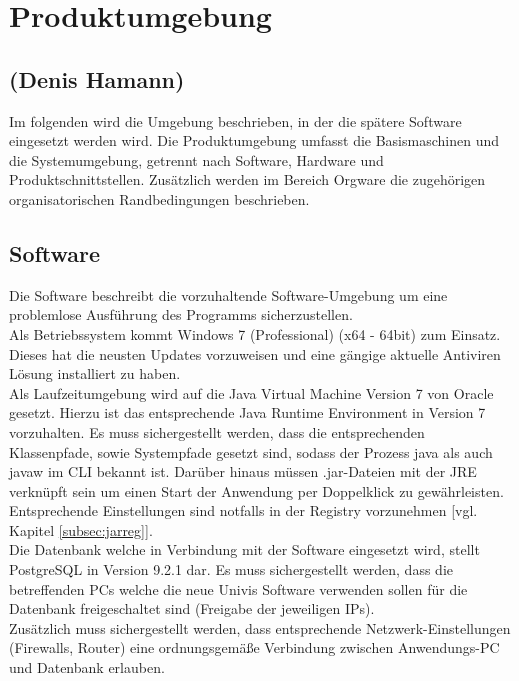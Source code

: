 \section{Produktumgebung}
\label{sec:Produktumgebung}

\subsection*{(Denis Hamann)}

Im folgenden wird die Umgebung beschrieben, in der die spätere Software eingesetzt werden wird.
Die Produktumgebung umfasst die Basismaschinen und die Systemumgebung, getrennt nach Software, Hardware und
Produktschnittstellen. Zusätzlich werden im Bereich Orgware die zugehörigen organisatorischen Randbedingungen beschrieben.

\subsection{Software}
\label{subsec:software}

Die Software beschreibt die vorzuhaltende Software-Umgebung um eine problemlose Ausführung des Programms sicherzustellen.\\


Als Betriebssystem kommt Windows 7 (Professional) (x64 - 64bit) zum Einsatz. Dieses hat die neusten Updates vorzuweisen und eine gängige aktuelle Antiviren Lösung installiert zu haben.\\

Als Laufzeitumgebung wird auf die Java Virtual Machine Version 7 von Oracle gesetzt.
Hierzu ist das entsprechende Java Runtime Environment in Version 7 vorzuhalten. Es muss sichergestellt werden, dass die entsprechenden Klassenpfade, sowie Systempfade gesetzt sind, sodass der Prozess java als auch javaw im CLI bekannt ist. Darüber hinaus müssen .jar-Dateien mit der JRE verknüpft sein um einen Start der Anwendung per Doppelklick zu gewährleisten. Entsprechende Einstellungen sind notfalls in der Registry vorzunehmen [vgl. Kapitel \ref{subsec:jarreg}].\\

Die Datenbank welche in Verbindung mit der Software eingesetzt wird, stellt PostgreSQL in Version 9.2.1 dar.
Es muss sichergestellt werden, dass die betreffenden PCs welche die neue Univis Software verwenden sollen für die Datenbank freigeschaltet sind (Freigabe der jeweiligen IPs).\\

Zusätzlich muss sichergestellt werden, dass entsprechende Netzwerk-Einstellungen (Firewalls, Router) eine ordnungsgemäße Verbindung zwischen Anwendungs-PC und Datenbank erlauben.\\


